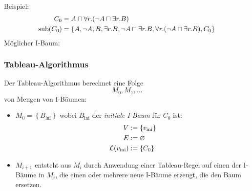 \begin{tafel}
    Beispiel:
    \begin{align*}
        C_0 &= A \sqcap \forall r.(\neg A \sqcap \exists r.B)\\
        \operatorname{sub}(C_0) &= \{A, \neg A, B, \exists r.B, \neg A \sqcap \exists r.B, \forall r.(\neg A \sqcap \exists r.B), C_0\}
    \end{align*}
Möglicher I-Baum:
\begin{center}
 \end{center}
\end{tafel}

\subsubsection{Tableau-Algorithmus}\label{tableau-algorithmus}

Der Tableau-Algorithmus berechnet eine Folge $$M_0,M_1,\ldots$$ von Mengen von I-Bäumen:
\begin{itemize}
    \item $M_0 = \left\{ B_{\text{ini}} \right\}$ wobei $B_{\text{ini}}$ der \emph{initiale I-Baum} für $C_0$ ist:
        \begin{align*}
            V &:= \left\{ v_{\text{ini}} \right\}\\
            E &:= \emptyset\\
            \ML\left(v_{\text{ini}}\right) &:= \left\{ C_0 \right\}
        \end{align*}
    \item $M_{i + 1}$ entsteht aus $M_i$ durch Anwendung einer Tableau-Regel
        auf einen der I-Bäume in $M_i$, die einen oder mehrere neue I-Bäume
        erzeugt, die den Baum ersetzen.
\end{itemize}

